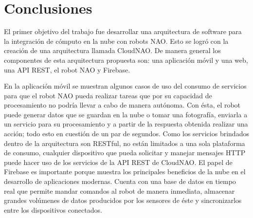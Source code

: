 \chapter*{Conclusiones}
\label{\detokenize{conclusion:cloudnao-una-arquitectura-de-software-para-la-integracion-de-computo-en-la-nube-con-robots-nao}}\label{\detokenize{conclusion:conclusion}}\label{\detokenize{conclusion::doc}}

El primer objetivo del trabajo fue
desarrollar una arquitectura de software para la
integración de cómputo en la nube con robots NAO.
Esto se logró con la creación de una arquitectura llamada
CloudNAO. 
De manera general los componentes de esta arquitectura propuesta son:
una aplicación móvil y una web, una API REST, el robot NAO y Firebase.

En la aplicación
móvil se muestran algunos casos de uso del consumo de
servicios para que el robot NAO pueda realizar tareas
que por su capacidad de procesamiento no podría 
llevar a cabo de manera autónoma.
Con ésta, el robot puede generar datos que
se guardan en la nube o tomar una fotografía,
enviarla a un servicio para su procesamiento y a partir
de la respuesta obtenida realizar una acción; todo
esto en cuestión de un par de segundos.
Como los servicios brindados dentro de la arquitectura son 
RESTful, no están limitados a una sola plataforma
de consumo, cualquier dispositivo que pueda solicitar y
manejar mensajes HTTP puede hacer uso de los servicios
de la API REST de CloudNAO.
El papel de Firebase es importante porque muestra
los principales beneficios de la nube en el desarrollo
de aplicaciones modernas. Cuenta con una base de datos en tiempo
real que permite mandar comandos al robot de manera
inmediata, almacenar grandes volúmenes de datos
producidos por los sensores de éste y sincronizarlos entre los dispositivos conectados.

